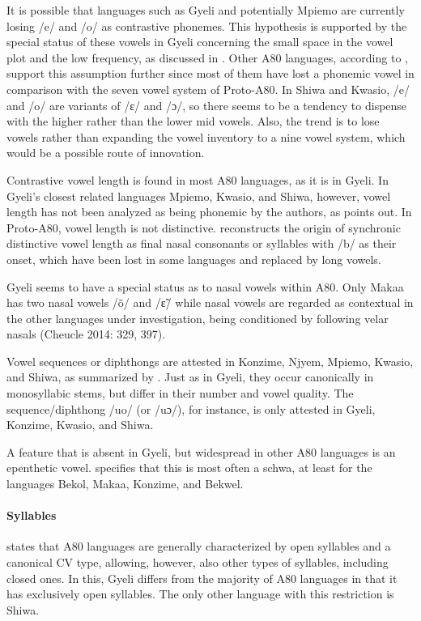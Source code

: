 It is possible that languages such as Gyeli and potentially Mpiemo are currently losing /e/ and /o/ as contrastive phonemes. This hypothesis is supported by the special status of these vowels in Gyeli concerning the small space in the vowel plot and the low frequency, as discussed in . Other A80 languages, according to \citet[324-325]{cheucle2014}, support this assumption further since most of them have lost a phonemic vowel in comparison with the seven vowel system of Proto-A80.  In Shiwa and Kwasio, /e/ and /o/ are variants of /ɛ/ and /ɔ/, so there seems to be a tendency to dispense with the higher rather than the lower mid vowels. Also, the trend is to lose vowels rather than expanding the vowel inventory to a nine vowel system, which would be a possible route of innovation.

Contrastive vowel length is found in most A80 languages, as it is in Gyeli. In Gyeli's closest related languages Mpiemo, Kwasio, and Shiwa, however, vowel length has not been analyzed as being phonemic by the authors, as \citet[327]{cheucle2014} points out. In Proto-A80, vowel length is not distinctive. \citet[395-396]{cheucle2014} reconstructs the origin of synchronic distinctive vowel length as final nasal consonants or syllables with /b/ as their onset, which have been lost in some languages and replaced by long vowels.

Gyeli seems to have a special status as to nasal vowels within A80. Only Makaa has two nasal vowels /õ/ and /ɛ̃/ while nasal vowels are regarded as contextual in the other languages under investigation, being conditioned by following velar nasals (Cheucle 2014: 329, 397).

Vowel sequences or diphthongs are attested in Konzime, Njyem, Mpiemo, Kwasio, and Shiwa, as summarized by \citet[330]{cheucle2014}. Just as in Gyeli, they occur canonically in monosyllabic stems, but differ in their number and vowel quality. The sequence/diphthong /uo/ (or /uɔ/), for instance, is only attested in Gyeli, Konzime, Kwasio, and Shiwa.

A feature that is absent in Gyeli, but widespread in other A80 languages is an epenthetic vowel. \citet[332]{cheucle2014} specifies that this is most often a schwa, at least for the languages Bekol, Makaa, Konzime, and Bekwel.

\paragraph{Syllables} \citet[319]{cheucle2014} states that A80 languages are generally characterized by open syllables and a canonical CV type, allowing, however, also other types of syllables, including closed ones. In this, Gyeli differs from the majority of A80 languages in that it  has exclusively open syllables. The only other language with this restriction is Shiwa.

